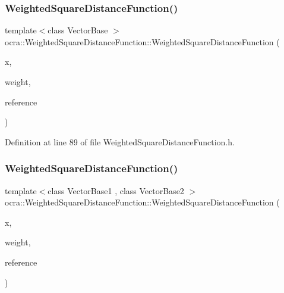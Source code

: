 \subsubsection{\texorpdfstring{Weighted\+Square\+Distance\+Function()}{WeightedSquareDistanceFunction()}\hspace{0.1cm}{\footnotesize\ttfamily [1/2]}}
{\footnotesize\ttfamily template$<$class Vector\+Base $>$ \\
ocra\+::\+Weighted\+Square\+Distance\+Function\+::\+Weighted\+Square\+Distance\+Function (\begin{DoxyParamCaption}\item[{\hyperlink{classocra_1_1Variable}{Variable} \&}]{x,  }\item[{double}]{weight,  }\item[{const Vector\+Base \&}]{reference }\end{DoxyParamCaption})\hspace{0.3cm}{\ttfamily [inline]}}



Definition at line 89 of file Weighted\+Square\+Distance\+Function.\+h.

\hypertarget{classocra_1_1WeightedSquareDistanceFunction_a1aca7da80ddc408d8194d32712418b89}{}\label{classocra_1_1WeightedSquareDistanceFunction_a1aca7da80ddc408d8194d32712418b89} 
\subsubsection{\texorpdfstring{Weighted\+Square\+Distance\+Function()}{WeightedSquareDistanceFunction()}\hspace{0.1cm}{\footnotesize\ttfamily [2/2]}}
{\footnotesize\ttfamily template$<$class Vector\+Base1 , class Vector\+Base2 $>$ \\
ocra\+::\+Weighted\+Square\+Distance\+Function\+::\+Weighted\+Square\+Distance\+Function (\begin{DoxyParamCaption}\item[{\hyperlink{classocra_1_1Variable}{Variable} \&}]{x,  }\item[{const Vector\+Base1 \&}]{weight,  }\item[{const Vector\+Base2 \&}]{reference }\end{DoxyParamCaption})\hspace{0.3cm}{\ttfamily [inline]}}



